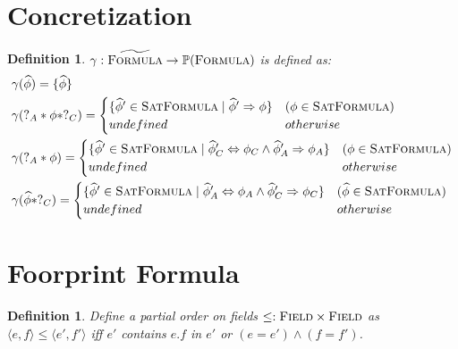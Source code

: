 \documentclass {article}
\newtheorem{lemma}[theorem]{Lemma}
\newtheorem{definition}[theorem]{Definition}
\newcommand{\fphi}{\widehat{\phi}}
\newcommand{\imp}{\Rightarrow}
\newcommand{\satdef}{\textsc{SatFormula}}
\newcommand{\formula}{\textsc{Formula}}
\newcommand{\gradformula}{\widetilde{\textsc{Formula}}}
\begin{document}
\section{Concretization}
\begin{definition}
\label{def_conc}
$\gamma : \gradformula \rightarrow \mathbb{P}(\formula)$ is defined as:
\begin{align*}
&\gamma(\fphi) = \{\fphi\}\\
&\gamma(?_A \ast \phi \ast ?_C) = 
	\begin{cases}
	 \{\fphi' \in \satdef \mid \fphi' \imp \phi\} & (\phi \in \satdef)\\
	 undefined &otherwise\\
	\end{cases} \\
&\gamma(?_A \ast \phi) = 
	\begin{cases}
	 \{\fphi' \in \satdef \mid \fphi'_C \Leftrightarrow \phi_C \wedge \fphi'_A \imp \phi_A\} & (\phi \in \satdef)\\
	 undefined &otherwise\\
	\end{cases} \\
&\gamma(\fphi \ast ?_C) = 
	\begin{cases}
	 \{\fphi' \in \satdef \mid \fphi'_A \Leftrightarrow \phi_A \wedge \fphi'_C \imp \phi_C\} & (\fphi \in \satdef)\\
	 undefined &otherwise\\
	\end{cases} \\
\end{align*}
\end{definition}


\section{Foorprint Formula}
\begin{definition}
Define a partial order on fields $\leq : \textsc{Field} \times \textsc{Field}$ as $\langle e,f\rangle \leq \langle e',f'\rangle$ iff $e'$ contains $e.f$ in $e'$ or $(e = e') \wedge (f = f')$.
\end{definition}
\end{document}
